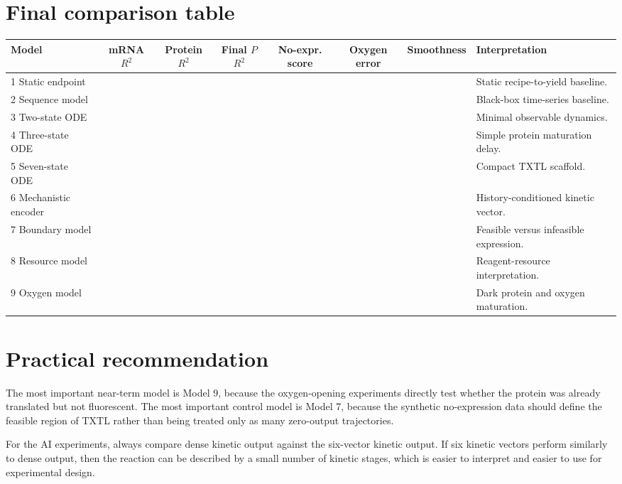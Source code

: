 \documentclass[11pt]{article}
\begin{document}
\section{Final comparison table}

\begin{center}
\begin{tabularx}{\textwidth}{lccccccX}
\toprule
Model & mRNA $R^2$ & Protein $R^2$ & Final $P$ $R^2$ & No-expr. score & Oxygen error & Smoothness & Interpretation \\
\midrule
1 Static endpoint & & & & & & & Static recipe-to-yield baseline. \\
2 Sequence model & & & & & & & Black-box time-series baseline. \\
3 Two-state ODE & & & & & & & Minimal observable dynamics. \\
4 Three-state ODE & & & & & & & Simple protein maturation delay. \\
5 Seven-state ODE & & & & & & & Compact TXTL scaffold. \\
6 Mechanistic encoder & & & & & & & History-conditioned kinetic vector. \\
7 Boundary model & & & & & & & Feasible versus infeasible expression. \\
8 Resource model & & & & & & & Reagent-resource interpretation. \\
9 Oxygen model & & & & & & & Dark protein and oxygen maturation. \\
\bottomrule
\end{tabularx}
\end{center}



\section{Practical recommendation}

The most important near-term model is Model 9, because the oxygen-opening experiments directly test whether the protein was already translated but not fluorescent. The most important control model is Model 7, because the synthetic no-expression data should define the feasible region of TXTL rather than being treated only as many zero-output trajectories.

For the AI experiments, always compare dense kinetic output against the six-vector kinetic output. If six kinetic vectors perform similarly to dense output, then the reaction can be described by a small number of kinetic stages, which is easier to interpret and easier to use for experimental design.
\end{document}
